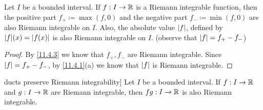 \begin{cor}\label{11.4.4}
  \quad
  Let \(I\) be a bounded interval.
  If \(f : I \to \mathbb{R}\) is a Riemann integrable function, then the positive part \(f_+ \coloneqq \max(f, 0)\) and the negative part \(f_- \coloneqq \min(f, 0)\) are also Riemann integrable on \(I\).
  Also, the absolute value \(\left\lvert f\right\rvert\), defined by \(\abs{f}(x) = \abs{f(x)}\) is also Riemann integrable on \(I\).
  (observe that \(\left\lvert f\right\rvert = f_+ - f_-\))
\end{cor}

\begin{proof}
  By \cref{11.4.3} we know that \(f_+, f_-\) are Riemann integrable.
  Since \(\left\lvert f\right\rvert = f_+ - f_-\), by \cref{11.4.1}(a) we know that \(\left\lvert f\right\rvert\) is Riemann integrable.
\end{proof}

\begin{thm}ducts preserve Riemann integrability]\label{11.4.5}
  Let \(I\) be a bounded interval.
  If \(f : I \to \mathbb{R}\) and \(g : I \to \mathbb{R}\) are Riemann integrable, then \(fg : I \to \mathbb{R}\) is also Riemann integrable.
\end{thm}


